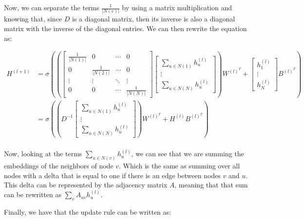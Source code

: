 \documentclass{article}
\begin{document}
Now, we can separate the terms $\frac{1}{|N(v)|}$ by using a matrix multiplication and knowing that, since $D$ is a diagonal matrix,
then its inverse is also a diagonal matrix with the inverse of the diagonal entries. We can then rewrite the equation as:

\begin{align*}
    H^{(l+1)} & = \sigma \left( \left(
        \begin{bmatrix}
            \frac{1}{|N(1)|} & 0 & \cdots & 0 \\
            0 & \frac{1}{|N(2)|} & \cdots & 0 \\
            \vdots & \vdots & \ddots & \vdots \\
            0 & 0 & \cdots & \frac{1}{|N(N)|}
        \end{bmatrix}
        \begin{bmatrix}
        \sum_{u \in N(1)} h_u^{(l)} \\
        \vdots \\
        \sum_{u \in N(N)} h_u^{(l)}
    \end{bmatrix} \right) W^{(l)^T} + \begin{bmatrix}
        h_1^{(l)} \\
        \vdots \\
        h_N^{(l)}
    \end{bmatrix} B^{(l)^T}
    \right) \\
    &=
    \sigma \left( \left(
        D^{-1}
        \begin{bmatrix}
            \sum_{u \in N(1)} h_u^{(l)} \\
            \vdots \\
            \sum_{u \in N(N)} h_u^{(l)}
        \end{bmatrix} \right) W^{(l)^T} + H^{(l)} B^{(l)^T}
    \right) \\
\end{align*}

Now, looking at the terms $\sum_{u \in N(v)} h_u^{(l)}$, we can see that we are summing the embeddings of the neighbors of node $v$.
Which is the same as summing over all nodes with a delta that is equal to one if there is an edge between nodes $v$ and $u$. This
delta can be represented by the adjacency matrix $A$, meaning that that sum can be rewritten as $\sum_{v} A_{uv} h_u^{(l)}$.

Finally, we have that the update rule can be written as:
\end{document}
